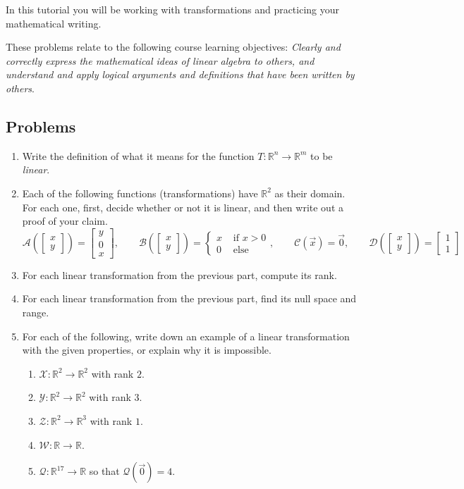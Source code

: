\documentclass[red]{tutorial}
\newcommand{\R}{\mathbb{R}}
\newcommand{\mat}[1]{\begin{bmatrix}#1\end{bmatrix}}
\theoremstyle{definition}
\theoremstyle{theorem}
\begin{document}
	\begin{tutorial}

		\begin{objectives}
	In this tutorial you will be working with transformations and practicing your
			mathematical writing.

	These problems relate to the following course learning objectives:
			\textit{Clearly and correctly express the mathematical ideas of linear algebra to others,
			and understand and apply logical arguments and definitions that have been written by others}.
		\end{objectives}


\subsection*{Problems}


\begin{enumerate}
	\item Write the definition of what it means for the function $T:\R^n\to\R^m$ to be \emph{linear}.

	\item Each of the following functions (transformations) have $\R^2$ as their domain.
		For each one, first, decide whether or not
		it is linear, and then write out a proof of your claim.
		\[
			\mathcal A\left(\mat{x\\y}\right) = \mat{y\\0\\x},\qquad
			\mathcal B\left(\mat{x\\y}\right) = \begin{cases}
								x &\text{ if } x>0\\
								0 &\text{ else}
								\end{cases},\qquad
			\mathcal C\left(\vec x\right) = \vec 0,\qquad
			\mathcal D\left(\mat{x\\y}\right) = \mat{1\\1}
		\]
	\item For each linear transformation from the previous part, compute its rank.
	\item For each linear transformation from the previous part, find its null space and range.
	\item For each of the following, write down an example of a linear transformation with the
		given properties, or explain why it is impossible.
		\begin{enumerate}
			\item $\mathcal X:\R^2\to\R^2$ with rank $2$.
			\item $\mathcal Y:\R^2\to\R^2$ with rank $3$.
			\item $\mathcal Z:\R^2\to\R^3$ with rank $1$.
			\item $\mathcal W:\R\to\R$.
			\item $\mathcal Q:\R^{17}\to\R$ so that $\mathcal Q(\vec 0)=4$.
		\end{enumerate}
\end{enumerate}
	\end{tutorial}
\end{document}
